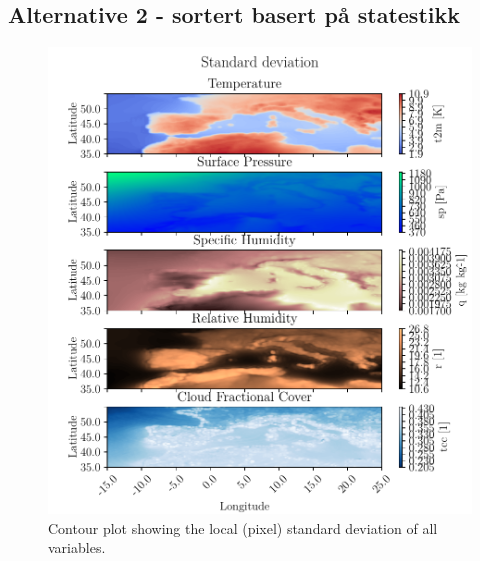 \subsection{Alternative 2 - sortert basert på statestikk }
\begin{figure}[ht]
    \centering
    \includegraphics{python_figs/contourplot_all_variables_std.pdf}
    \caption{Contour plot showing the local (pixel) standard deviation of all variables.}
    \label{fig:contour_std_all_vars}
\end{figure}

